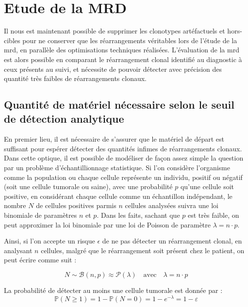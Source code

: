 \section{Etude de la MRD}

Il nous est maintenant possible de supprimer les clonotypes artéfactuels et hors-cibles pour ne conserver que les réarrangements véritables lors de 
l'étude de la \gls{mrd}, en parallèle des optimisations techniques réalisées. L'évaluation de la \gls{mrd} est alors possible en comparant le réarrangement
clonal identifié au diagnostic à ceux présents au suivi, et nécessite de pouvoir détecter avec précision des quantité très faibles de réarrangements clonaux.

\subsection{Quantité de matériel nécessaire selon le seuil de détection analytique}

En premier lieu, il est nécessaire de s'assurer que le matériel de départ est suffisant pour espérer détecter des quantités infimes de réarrangements 
clonaux. Dans cette optique, il est possible de modéliser de façon assez simple la question par un problème d'échantillionnage statistique. Si l'on considère 
l'organisme comme la population ou chaque cellule représente un individu, positif ou négatif (soit une cellule tumorale ou saine), avec une probabilité $p$ 
qu'une cellule soit positive, en considérant chaque cellule comme un échantillon indépendant, le nombre $N$ de cellules positives parmis $n$ cellules analysées 
suivra une loi binomiale de paramètres $n$ et $p$. Dans les faits, sachant que $p$ est très faible, on peut approximer la loi binomiale par une loi de Poisson de 
paramètre $\lambda = n \cdot p$. 

\vspace{1em}

Ainsi, si l'on accepte un risque $\epsilon$ de ne pas détecter un réarrangement clonal, en analysant $n$ cellules, malgré que le réarrangement soit présent chez le 
patient, on peut écrire comme suit :

\begin{equation}
    N \sim \mathcal{B}(n, p) \approx \mathcal{P}(\lambda)
    \quad \text{avec} \quad \lambda = n \cdot p
\end{equation}

La probabilité de détecter au moins une cellule tumorale est donnée par :
\begin{equation}
    \mathbb{P}(N \geq 1) = 1 - \mathbb{P}(N = 0) = 1 - e^{-\lambda} = 1 - \varepsilon
\end{equation}

